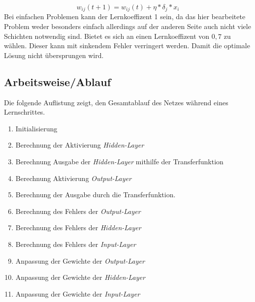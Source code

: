\begin{equation}
    w_{ij}(t+1) = w_{ij}(t) + \eta * \delta_j*x_i
    \label{eqn:gewichte}
\end{equation}
Bei einfachen Problemen kann der Lernkoeffizent 1 sein, da das hier 
bearbeitete Problem weder besonders einfach allerdings auf der anderen Seite auch 
nicht viele Schichten notwendig sind. Bietet es sich an einen Lernkoeffizent von 
$0,7$ zu wählen. Dieser kann mit sinkendem Fehler verringert werden. 
Damit die optimale Lösung nicht übersprungen wird.

\subsection{Arbeitsweise/Ablauf}
Die folgende Auflistung zeigt, den Gesamtablauf des Netzes während eines 
Lernschrittes.
\begin{enumerate}
    \item Initialisierung
    \item Berechnung der Aktivierung \textit{Hidden-Layer}
    \item Berechnung Ausgabe der \textit{Hidden-Layer} mithilfe der Transferfunktion
    \item Berechnung Aktivierung \textit{Output-Layer}
    \item Berechnung der Ausgabe durch die Transferfunktion.
    \item Berechnung des Fehlers der \textit{Output-Layer}
    \item Berechnung des Fehlers der \textit{Hidden-Layer}
    \item Berechnung des Fehlers der \textit{Input-Layer}
    \item Anpassung der Gewichte der \textit{Output-Layer}
    \item Anpassung der Gewichte der \textit{Hidden-Layer}
    \item Anpassung der Gewichte der \textit{Input-Layer}
\end{enumerate}